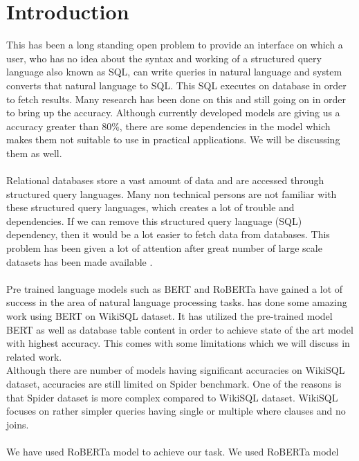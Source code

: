 \documentclass[12pt]{article}
\begin{document}
 

\section{Introduction}
 
This has been a long standing open problem to provide an interface on which a user, who has no idea about the syntax and working of a structured query language also known as SQL, can write queries in natural language and system converts that natural language to SQL. This SQL executes on database in order to fetch results. Many research has been done on this and still going on in order to bring up the accuracy. Although currently developed models are giving us a accuracy greater than 80\%, there are some dependencies in the model which makes them not suitable to use in practical applications. We will be discussing them as well.
\\ \\
 Relational databases store a vast amount of data and are accessed through structured query languages. Many non technical persons are not familiar with these structured query languages, which creates a lot of trouble and dependencies. If we can remove this structured query language (SQL) dependency, then it would be a lot easier to fetch data from databases. This problem has been given a lot of attention after great number of  large scale datasets has been made available \cite{zhong2017seq2sql} \cite{setlur2019inferencing} \cite{yu2018spider}. 
\\ \\
Pre trained language models such as BERT \cite{devlin2018bert} and RoBERTa \cite{liu2019roberta}  have gained a lot of success in the area of natural language processing tasks. \cite{guo2019content} has done some amazing work using BERT on WikiSQL dataset. It has utilized the pre-trained model BERT as well as database table content in order to achieve state of the art model with highest accuracy. This comes with some limitations which we will discuss in related work. 
\\Although there are number of models having significant accuracies on WikiSQL dataset, accuracies are still limited on Spider benchmark\cite{yu2018spider}. One of the reasons is that Spider dataset is more complex compared to WikiSQL dataset. WikiSQL focuses on rather simpler queries having single or multiple where clauses and no joins.\\
\\
We have used RoBERTa model to achieve our task. We used RoBERTa model
\end{document}
